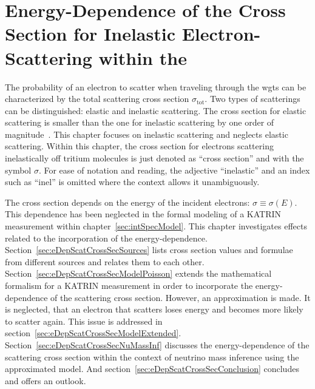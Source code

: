 \def\currentRootFolder{chapter/energyDependentCrossSec}
\def\currentFigureFolder{\currentRootFolder/fig}


\chapter{Energy-Dependence of the Cross Section for Inelastic Electron-Scattering within the }
\label{sec:eDepScatCrossSec}
The probability of an electron to scatter when traveling through the \gls{wgts} can be characterized by the total scattering cross section $\sigma_\mathrm{tot}$. Two types of scatterings can be distinguished: elastic and inelastic scattering. The cross section for elastic scattering is smaller than the one for inelastic scattering by one order of magnitude~\cite{Kleesiek2019}. This chapter focuses on inelastic scattering and neglects elastic scattering. Within this chapter, the cross section for electrons scattering inelastically off tritium molecules is just denoted as ``cross section'' and with the symbol $\sigma$. For ease of notation and reading, the adjective ``inelastic'' and an index such as ``inel'' is omitted where the context allows it unambiguously.

The cross section depends on the energy of the incident electrons: $\sigma \equiv \sigma(E)$. This dependence has been neglected in the formal modeling of a KATRIN measurement within chapter~\ref{sec:intSpecModel}. This chapter investigates effects related to the incorporation of the energy-dependence. Section~\ref{sec:eDepScatCrossSecSources} lists cross section values and formulae from different sources and relates them to each other. Section~\ref{sec:eDepScatCrossSecModelPoisson} extends the mathematical formalism for a KATRIN measurement in order to incorporate the energy-dependence of the scattering cross section. However, an approximation is made. It is neglected, that an electron that scatters loses energy and becomes more likely to scatter again. This issue is addressed in section~\ref{sec:eDepScatCrossSecModelExtended}. Section~\ref{sec:eDepScatCrossSecNuMassInf} discusses the energy-dependence of the scattering cross section within the context of neutrino mass inference using the approximated model. And section~\ref{sec:eDepScatCrossSecConclusion} concludes and offers an outlook.


